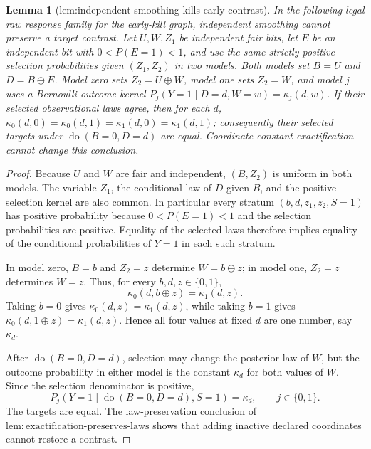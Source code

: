 \documentclass{article}
\newtheorem{lemma}{Lemma}
\begin{document}
\begin{lemma}[lem:independent-smoothing-kills-early-contrast]\label{lem:independent-smoothing-kills-early-contrast}
In the following legal raw response family for the early-kill graph, independent smoothing cannot preserve a target contrast. Let \(U,W,Z_1\) be independent fair bits, let \(E\) be an independent bit with \(0<P(E=1)<1\), and use the same strictly positive selection probabilities given \((Z_1,Z_2)\) in two models. Both models set \(B=U\) and \(D=B\oplus E\). Model zero sets \(Z_2=U\oplus W\), model one sets \(Z_2=W\), and model \(j\) uses a Bernoulli outcome kernel \(P_j(Y=1\mid D=d,W=w)=\kappa_j(d,w)\). If their selected observational laws agree, then for each \(d\), \(\kappa_0(d,0)=\kappa_0(d,1)=\kappa_1(d,0)=\kappa_1(d,1)\); consequently their selected targets under \(\operatorname{do}(B=0,D=d)\) are equal. Coordinate-constant exactification cannot change this conclusion.
\end{lemma}
\begin{proof}
Because \(U\) and \(W\) are fair and independent, \((B,Z_2)\) is uniform in both models. The variable \(Z_1\), the conditional law of \(D\) given \(B\), and the positive selection kernel are also common. In particular every stratum \((b,d,z_1,z_2,S=1)\) has positive probability because \(0<P(E=1)<1\) and the selection probabilities are positive. Equality of the selected laws therefore implies equality of the conditional probabilities of \(Y=1\) in each such stratum.

In model zero, \(B=b\) and \(Z_2=z\) determine \(W=b\oplus z\); in model one, \(Z_2=z\) determines \(W=z\). Thus, for every \(b,d,z\in\{0,1\}\),
\[
 \kappa_0(d,b\oplus z)=\kappa_1(d,z).
\]
Taking \(b=0\) gives \(\kappa_0(d,z)=\kappa_1(d,z)\), while taking \(b=1\) gives \(\kappa_0(d,1\oplus z)=\kappa_1(d,z)\). Hence all four values at fixed \(d\) are one number, say \(\kappa_d\).

After \(\operatorname{do}(B=0,D=d)\), selection may change the posterior law of \(W\), but the outcome probability in either model is the constant \(\kappa_d\) for both values of \(W\). Since the selection denominator is positive,
\[
 P_j(Y=1\mid\operatorname{do}(B=0,D=d),S=1)=\kappa_d,
 \qquad j\in\{0,1\}.
\]
The targets are equal. The law-preservation conclusion of \(\mathrm{lem:exactification\text{-}preserves\text{-}laws}\) shows that adding inactive declared coordinates cannot restore a contrast.
\end{proof}
\end{document}
